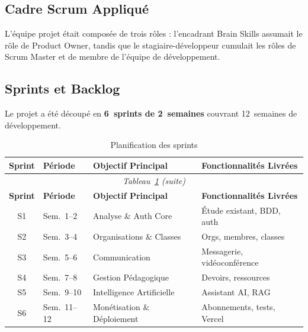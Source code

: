 \documentclass[12pt, a4paper, twoside]{report}
\begin{document}
\subsection{Cadre Scrum Appliqué}

L'équipe projet était composée de trois rôles : l'encadrant Brain Skills assumait
le rôle de Product Owner, tandis que le stagiaire-développeur cumulait les rôles
de Scrum Master et de membre de l'équipe de développement.

\subsection{Sprints et Backlog}

Le projet a été découpé en \textbf{6~sprints de 2~semaines} couvrant
12~semaines de développement.

\begin{longtable}{|c|l|l|l|}
  \caption{Planification des sprints}\label{tab:sprints}\\
  \hline
  \textbf{Sprint} & \textbf{Période} & \textbf{Objectif Principal} & \textbf{Fonctionnalités Livrées} \\
  \hline
  \endfirsthead
  \multicolumn{4}{c}{\textit{Tableau~\ref{tab:sprints} (suite)}} \\
  \hline
  \textbf{Sprint} & \textbf{Période} & \textbf{Objectif Principal} & \textbf{Fonctionnalités Livrées} \\
  \hline
  \endhead
  \hline
  \endfoot
  S1 & Sem.~1--2  & Analyse \& Auth Core   & Étude existant, BDD, auth \\
  S2 & Sem.~3--4  & Organisations \& Classes & Orgs, membres, classes \\
  S3 & Sem.~5--6  & Communication          & Messagerie, vidéoconférence \\
  S4 & Sem.~7--8  & Gestion Pédagogique    & Devoirs, ressources \\
  S5 & Sem.~9--10 & Intelligence Artificielle & Assistant AI, RAG \\
  S6 & Sem.~11--12 & Monétisation \& Déploiement &  Abonnements, tests, Vercel \\

\end{longtable}
\end{document}

